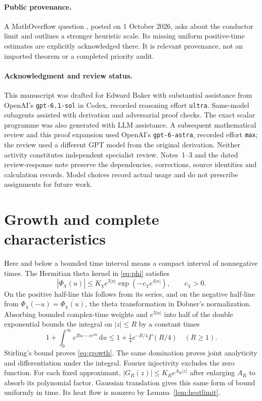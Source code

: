 \documentclass[11pt]{article}
\theoremstyle{remark}\newtheorem{remark}[theorem]{Remark}
\newcommand{\dd}{\mathrm{d}}
\begin{document}
\paragraph{Public provenance.}
A MathOverflow question \cite{mo}, posted on 1 October 2026, asks about
the conductor limit and outlines a stronger heuristic scale. Its missing
uniform positive-time estimates are explicitly acknowledged there. It is
relevant provenance, not an imported theorem or a completed priority audit.

\paragraph{Acknowledgment and review status.}
This manuscript was drafted for Edward Baker with substantial assistance
from OpenAI's \texttt{gpt-6.1-sol} in Codex, recorded reasoning effort
\texttt{ultra}. Same-model subagents assisted with derivation and
adversarial proof checks. The exact scalar programme was also generated
with LLM assistance. A subsequent mathematical review and this proof
expansion used OpenAI's \texttt{gpt-6-astra}, recorded effort \texttt{max};
the review used a different GPT model from the original derivation.
Neither activity constitutes independent specialist review. Notes~1--3
and the dated review-response note preserve the dependencies, corrections,
source identities and calculation records. Model choices record actual
usage and do not prescribe assignments for future work.


\appendix
\section{Growth and complete characteristics}\label{app:characteristics}

Here and below a bounded time interval means a compact interval of
nonnegative times. The Hermitian theta kernel in \eqref{eq:phi} satisfies
\[
 |\Phi_\chi(u)|\le K_\chi e^{3|u|}
                  \exp(-c_\chi e^{4|u|}),\qquad c_\chi>0.
\]
On the positive half-line this follows from its series, and on the
negative half-line from $\Phi_\chi(-u)=\overline{\Phi_\chi(u)}$, the
theta transformation in Dobner's normalization. Absorbing bounded
complex-time weights and $e^{3|u|}$ into half of the double exponential
bounds the integral on $|z|\le R$ by a constant times
\[
 1+\int_0^\infty e^{Ru-ce^{4u}}\,\dd u
 \le 1+\tfrac14c^{-R/4}\Gamma(R/4)\quad(R\ge1).
\]
Stirling's bound proves \eqref{eq:growth}. The same domination proves
joint analyticity and differentiation under the integral. Fourier
injectivity excludes the zero function. For each fixed approximant,
$|G_R(z)|\le K_R e^{A_R|z|}$ after enlarging $A_R$ to absorb its
polynomial factor. Gaussian translation gives this same form of bound
uniformly in time. Its heat flow is nonzero by Lemma~\ref{lem:heatlimit}.
\end{document}
